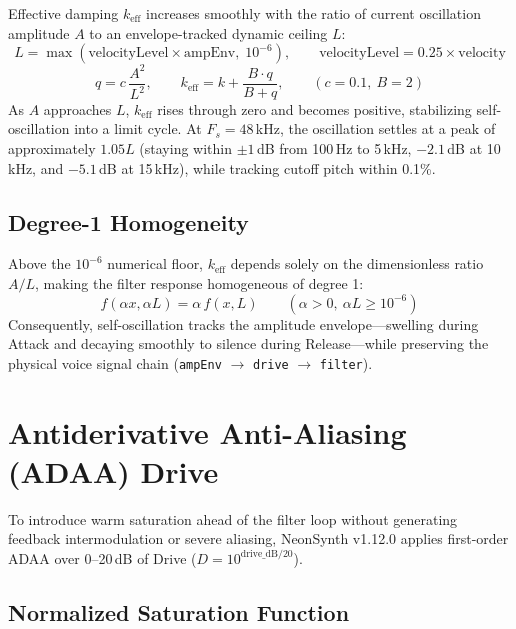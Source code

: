 \documentclass[11pt,letterpaper]{article}
\newcommand{\NSVersion}{1.12.0}
\newcommand{\code}[1]{\texttt{\textcolor{codegray}{#1}}}
\newcommand{\Fs}{F_s}
\begin{document}
Effective damping $k_{\mathrm{eff}}$ increases smoothly with the ratio of current oscillation amplitude $A$ to an envelope-tracked
dynamic ceiling $L$:
\begin{equation}\label{eq:ceiling}
  L = \max\!\left(\mathrm{velocityLevel} \times \mathrm{ampEnv},\; 10^{-6}\right), \qquad \mathrm{velocityLevel} = 0.25 \times \mathrm{velocity}
\end{equation}
\begin{equation}\label{eq:keff}
  q = c\,\frac{A^2}{L^2}, \qquad k_{\mathrm{eff}} = k + \frac{B \cdot q}{B + q}, \qquad (c = 0.1,\ B = 2)
\end{equation}
As $A$ approaches $L$, $k_{\mathrm{eff}}$ rises through zero and becomes positive, stabilizing self-oscillation into a limit cycle. At
$\Fs = 48$\,kHz, the oscillation settles at a peak of approximately $1.05L$ (staying within $\pm 1$\,dB from 100\,Hz to 5\,kHz,
$-2.1$\,dB at 10\,kHz, and $-5.1$\,dB at 15\,kHz), while tracking cutoff pitch within 0.1\%.

\subsection{Degree-1 Homogeneity}

Above the $10^{-6}$ numerical floor, $k_{\mathrm{eff}}$ depends solely on the dimensionless ratio $A/L$, making the filter response
homogeneous of degree 1:
\begin{equation}\label{eq:homog}
  f(\alpha x, \alpha L) = \alpha\, f(x, L) \qquad (\alpha > 0,\ \alpha L \ge 10^{-6})
\end{equation}
Consequently, self-oscillation tracks the amplitude envelope---swelling during Attack and decaying smoothly to
silence during Release---while preserving the physical voice signal chain (\code{ampEnv} $\rightarrow$ \code{drive} $\rightarrow$ \code{filter}).

\newpage
\section{Antiderivative Anti-Aliasing (ADAA) Drive}\label{sec:adaa}

To introduce warm saturation ahead of the filter loop without generating feedback intermodulation or severe aliasing,
NeonSynth v\NSVersion{} applies first-order ADAA over 0--20\,dB of Drive ($D = 10^{\mathrm{drive\_dB}/20}$).

\subsection{Normalized Saturation Function}
\end{document}
